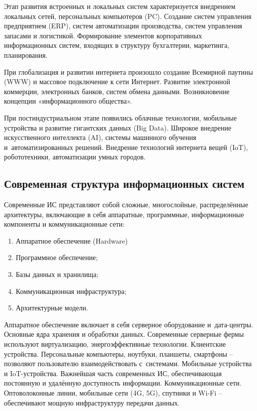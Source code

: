 \documentclass{ou}
\begin{document}
Этап развития встроенных и локальных систем характеризуется внедрением локальных сетей, персональных компьютеров (PC). Создание систем управления предприятием (ERP), систем автоматизации производства, систем управления запасами и логистикой.
Формирование элементов корпоративных информационных систем, входящих в структуру бухгалтерии, маркетинга, планирования.

При глобализация и развитии интернета произошло создание Всемирной паутины (WWW) и массовое подключение к сети Интернет. Развитие электронной коммерции, электронных банков, систем обмена данными. Возникновение концепции «информационного общества».

При постиндустриальном этапе появились облачные технологии, мобильные устройства и развитие гигантских данных (Big Data). Широкое внедрение искусственного интеллекта (AI), системы машинного обучения и~автоматизированных решений. Внедрение технологий интернета вещей (IoT), робототехники, автоматизации умных городов.
\subsection{Современная структура информационных систем}
Современные ИС представляют собой сложные, многослойные, распределённые архитектуры, включающие в себя аппаратные, программные, информационные компоненты и коммуникационные сети:
\begin{enumerate}[leftmargin=0em, itemindent=3.75em, nosep, label=\arabic*)]
\item Аппаратное обеспечение (Hardware)
\item Программное обеспечение;
\item Базы данных и хранилища;
\item Коммуникационная инфраструктура;
\item Архитектурные модели.
\end{enumerate}

Аппаратное обеспечение включает в себя серверное оборудование и~дата-центры. Основные ядра хранения и обработки данных. Современные серверные фермы используют виртуализацию, энергоэффективные технологии. Клиентские устройства. Персональные компьютеры, ноутбуки, планшеты, смартфоны -- позволяют пользователю взаимодействовать с~системами. Мобильные устройства и IoT-устройства. Важнейшая часть современных ИС, обеспечивающая постоянную и удалённую доступность информации. Коммуникационные сети. Оптоволоконные линии, мобильные сети (4G, 5G), спутники и Wi-Fi -- обеспечивают мощную инфраструктуру передачи данных.
\end{document}
